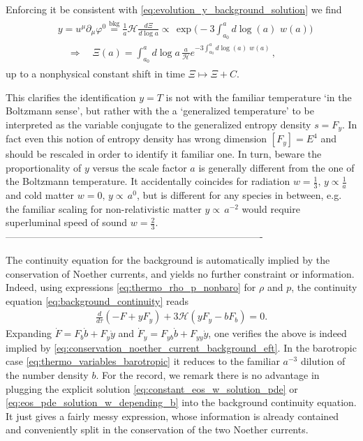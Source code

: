 {Enforcing it be consistent with \eqref{eq:evolution_y_background_solution} we find
\begin{align}\label{eq:bkg_scaling_y_coordinate}
\begin{aligned}
    &y=u^\mu\partial_\mu\varphi^0 \overset{\text{bkg}}{=}\tfrac{1}{a}\mathcal{H}\frac{d\Xi}{d\log\!a}\propto\, \exp\Big(\!\!-\!\!3\!\!\int^a_{a_0}\!\!\!\!\!d\!\log(a)\,\, w(a)\Big)\\[2.5pt]
    &\quad\Rightarrow\quad \Xi(a)=\int^a_{a_0}\!\!\!d\log\!a\, \frac{a}{\mathcal{H}}e^{-3\int^a_{a_0}\!d\!\log(a)\,\, w(a)}\,,
\end{aligned}\end{align}
up to a nonphysical constant shift in time $\Xi\mapsto \Xi +C$.

This clarifies the identification $y=T$ is not with the familiar temperature `in the Boltzmann sense', but rather with the a `generalized temperature' to be interpreted as the variable conjugate to the generalized entropy density $s=F_y$.
In fact even this notion of entropy density has wrong dimension $[F_y]=E^4$ and should be rescaled in order to identify it familiar one.
In turn, beware the proportionality of $y$ versus the scale factor $a$ is generally different from the one of the Boltzmann temperature.
It accidentally coincides for radiation $w=\tfrac13,\, y\propto \tfrac{1}{a}$ and cold matter $w=0,\,y\propto\, a^0$, but is different for any species in between, e.g. the familiar scaling for non-relativistic matter $y\propto\, a^{-2}$ would require superluminal speed of sound $w=\tfrac23$.
-------------------------------------------------------------------------------
}

The continuity equation for the background is automatically implied by the conservation of Noether currents, and yields no further constraint or information.
Indeed, using expressions \eqref{eq:thermo_rho_p_nonbaro} for $\rho$ and $p$, the continuity equation \eqref{eq:background_continuity} reads
\begin{align}\label{eq:backgroud_continuity_eft}
    \frac{d}{d\tau}(-F+yF_y)+3\mathcal{H}(yF_y-bF_b)=0.
\end{align}
Expanding $\dot{F}=F_b\dot{b}+F_y\dot{y}$ and $\dot{F}_y=F_{yb}\dot{b}+F_{yy}\dot{y}$, one verifies the above is indeed implied by \eqref{eq:conservation_noether_current_background_eft}.
In the barotropic case \eqref{eq:thermo_variables_barotropic} it reduces to the familiar $a^{-3}$ dilution of the number density $b$.
For the record, we remark there is no advantage in plugging the explicit solution \eqref{eq:constant_eos_w_solution_pde} or \eqref{eq:eos_pde_solution_w_depending_b} into the background continuity equation.
It just gives a fairly messy expression, whose information is already contained and conveniently split in the conservation of the two Noether currents.

